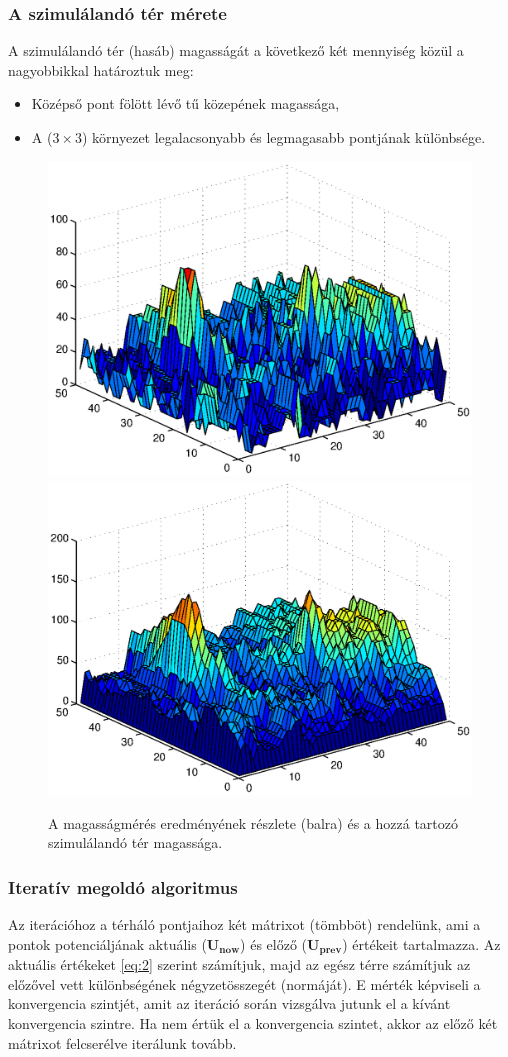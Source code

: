		\subsubsection{A szimulálandó tér mérete}
		A szimulálandó tér (hasáb) magasságát a következő két mennyiség közül a
		nagyobbikkal határoztuk meg:
		\begin{itemize}
			\item Középső pont fölött lévő tű közepének magassága,
			\item A ($3\times3$) környezet legalacsonyabb és legmagasabb pontjának
			különbsége.
		\end{itemize}
		
		\begin{figure}[!h]
			\centering
			\includegraphics[width=0.45\columnwidth]{kepek/eps/dimage.eps}
			\includegraphics[width=0.45\columnwidth]{kepek/eps/numh.eps}
			\caption{\scriptsize A magasságmérés eredményének részlete (balra) és a hozzá tartozó
			szimulálandó tér magassága.}
		\end{figure}
		
		\subsubsection{Iteratív megoldó algoritmus}
		Az iterációhoz a térháló pontjaihoz két mátrixot (tömbböt) rendelünk, ami a
		pontok potenciáljának aktuális ($\mathbf{U_{now}}$) és előző ($\mathbf{U_{prev}}$)
		értékeit tartalmazza.
		Az aktuális értékeket \eqref{eq:2} szerint számítjuk, majd az egész térre
		számítjuk az előzővel vett különbségének négyzetösszegét (normáját). E mérték
		képviseli a konvergencia szintjét, amit az iteráció során vizsgálva jutunk el a
		kívánt konvergencia szintre.
		Ha nem értük el a konvergencia szintet, akkor az előző két mátrixot
		felcserélve iterálunk tovább.
		
